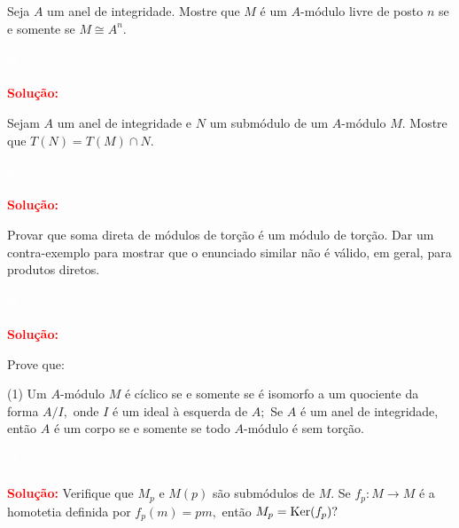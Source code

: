 \documentclass[11pt,a4paper]{article}
\newcounter{exercicio}[section]
\newcommand{\dividiritens}[1]{\begin{tasks}[counter-format={(tsk[a])},label-width=3.6ex, label-format = {\bfseries}, column-sep = {0pt}](1) #1 \end{tasks}}
\newcommand{\pers}[1]{\textcolor{Floresta}{$\negrito{(#1)} $}}
\newcommand{\solucao}[1]{
\textbf{\textcolor{white}{oi}\\ \\ \textcolor{red}{Solução:}} #1}
\begin{document}
 Seja $A$ um anel de integridade. Mostre que $M$ é um $A$-módulo livre de posto $n$ se e somente se $M \cong A^n.$
\solucao{}


 Sejam $A$ um anel de integridade e $N$ um submódulo de um $A$-módulo $M.$ Mostre que $T(N) =
T(M) \cap N.$

\solucao{}

 Provar que soma direta de módulos de torção é um módulo de torção. Dar um contra-exemplo para mostrar que o enunciado similar não é válido, em geral, para produtos diretos.
\solucao{}

 Prove que:
\dividiritens{
\task[\pers{a}] Um $A$-módulo $M$ é cíclico se e somente se é isomorfo a um quociente da forma $A/I,$ onde $I$ é um ideal à esquerda de $A;$
\task[\pers{b}] Se $A$ é um anel de integridade, então $A$ é um corpo se e somente se todo $A$-módulo é sem
torção.}

\solucao{}
 Verifique que $M_p$ e $M(p)$ são submódulos de $M.$ Se $f_p \colon M \to M$ é a homotetia definida por $f_p(m) = pm,$ então $M_p = {\rm Ker}(f_p)?$
\end{document}
